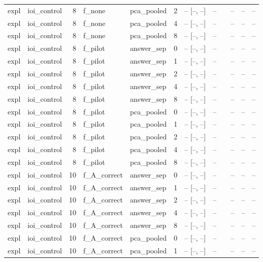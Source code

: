 \begin{tabular}{llrllrrrlrrr}
expl & ioi\_control & 8 & f\_none & pca\_pooled & 2 & -- [--, --] & -- &  & -- & -- & -- \\
expl & ioi\_control & 8 & f\_none & pca\_pooled & 4 & -- [--, --] & -- &  & -- & -- & -- \\
expl & ioi\_control & 8 & f\_none & pca\_pooled & 8 & -- [--, --] & -- &  & -- & -- & -- \\
expl & ioi\_control & 8 & f\_pilot & answer\_sep & 0 & -- [--, --] & -- &  & -- & -- & -- \\
expl & ioi\_control & 8 & f\_pilot & answer\_sep & 1 & -- [--, --] & -- &  & -- & -- & -- \\
expl & ioi\_control & 8 & f\_pilot & answer\_sep & 2 & -- [--, --] & -- &  & -- & -- & -- \\
expl & ioi\_control & 8 & f\_pilot & answer\_sep & 4 & -- [--, --] & -- &  & -- & -- & -- \\
expl & ioi\_control & 8 & f\_pilot & answer\_sep & 8 & -- [--, --] & -- &  & -- & -- & -- \\
expl & ioi\_control & 8 & f\_pilot & pca\_pooled & 0 & -- [--, --] & -- &  & -- & -- & -- \\
expl & ioi\_control & 8 & f\_pilot & pca\_pooled & 1 & -- [--, --] & -- &  & -- & -- & -- \\
expl & ioi\_control & 8 & f\_pilot & pca\_pooled & 2 & -- [--, --] & -- &  & -- & -- & -- \\
expl & ioi\_control & 8 & f\_pilot & pca\_pooled & 4 & -- [--, --] & -- &  & -- & -- & -- \\
expl & ioi\_control & 8 & f\_pilot & pca\_pooled & 8 & -- [--, --] & -- &  & -- & -- & -- \\
expl & ioi\_control & 10 & f\_A\_correct & answer\_sep & 0 & -- [--, --] & -- &  & -- & -- & -- \\
expl & ioi\_control & 10 & f\_A\_correct & answer\_sep & 1 & -- [--, --] & -- &  & -- & -- & -- \\
expl & ioi\_control & 10 & f\_A\_correct & answer\_sep & 2 & -- [--, --] & -- &  & -- & -- & -- \\
expl & ioi\_control & 10 & f\_A\_correct & answer\_sep & 4 & -- [--, --] & -- &  & -- & -- & -- \\
expl & ioi\_control & 10 & f\_A\_correct & answer\_sep & 8 & -- [--, --] & -- &  & -- & -- & -- \\
expl & ioi\_control & 10 & f\_A\_correct & pca\_pooled & 0 & -- [--, --] & -- &  & -- & -- & -- \\
expl & ioi\_control & 10 & f\_A\_correct & pca\_pooled & 1 & -- [--, --] & -- &  & -- & -- & -- \\

\end{tabular}
